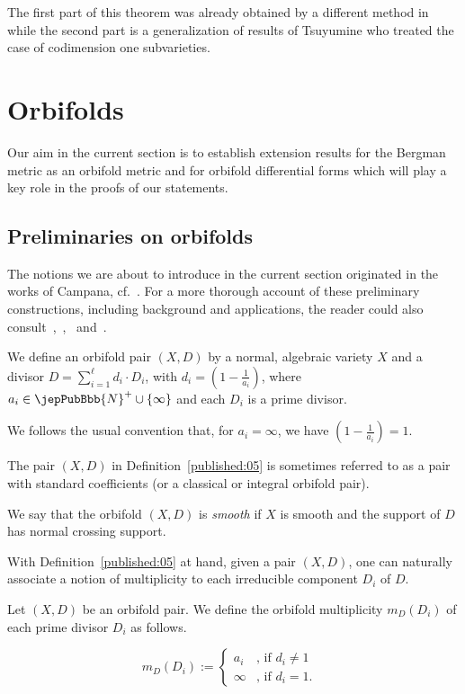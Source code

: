 The first part of this theorem was already obtained by a different method in \cite{pubref27} while the second part is a generalization of results of Tsuyumine \cite{pubref30} who treated the case of codimension one subvarieties.


\section{Orbifolds}\label{published:04}

Our aim in the current section is to establish extension results for the Bergman metric as an orbifold metric and
for orbifold differential forms which will play a key role in the proofs of our statements. 

\subsection{Preliminaries on orbifolds}
 The notions we are about to introduce in the current section originated in the 
 works of Campana, cf.~\cite{pubref07}. For a more thorough account of these
 preliminary constructions, including background and applications, 
 the reader could also consult~\cite{pubref17},~\cite{pubref28},~\cite{pubref08} and~\cite{pubref15}.
 
 

\begin{definition}\label{published:05}
We define an orbifold pair $(X,D)$ by a normal, algebraic variety $X$ and 
a divisor $D = \sum_{i=1}^\ell d_i \cdot D_i$, with $d_i = (1- \frac{1}{a_i})$, where 
$a_i \in \jepPubBbb{N}^+ \cup \{ \infty \}$ and each $D_i$ is a prime divisor. 

\end{definition}

We follows the usual convention that, for $a_i = \infty$, we have $(1- \frac{1}{a_i}) = 1$.

The pair $(X,D)$ in Definition~\ref{published:05} is sometimes referred to as a pair with standard coefficients
(or a classical or integral orbifold pair).

We say that the orbifold $(X,D)$ is \emph{smooth} if $X$ is smooth and the support of $D$ has normal crossing support.

With Definition~\ref{published:05} at hand, given a pair $(X,D)$, one can naturally associate a notion of 
multiplicity to each irreducible component $D_i$ of $D$.

\begin{definition}
Let $(X,D)$ be an orbifold pair. We define the orbifold multiplicity $m_{D}(D_i)$ of each 
prime divisor $D_i$ as follows. 

$$
  m_D(D_i) := \left\{ 
    \begin{matrix}
      a_i & \text{, if $d_i\neq 1$ } \\
      \infty & \text{, if $d_i=1.$  }
    \end{matrix}
  \right.
  $$

\end{definition}

